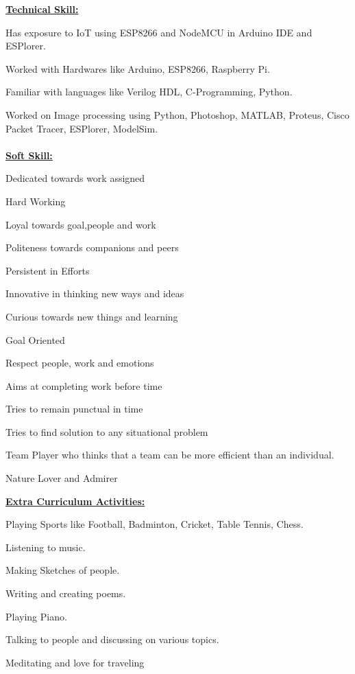 \documentclass[12pt]{report}
\begin{document}
{\vspace{205pt}
\textbf{\large{\underline{Technical Skill:}}}
\begin{itemize}
		\large{\item	Has exposure to IoT using ESP8266 and NodeMCU in Arduino IDE and ESPlorer. }
	\item Worked with Hardwares like Arduino, ESP8266, Raspberry Pi.
	\item Familiar with languages like Verilog HDL, C-Programming, Python.
	\item Worked on Image processing using Python, Photoshop, MATLAB, Proteus, Cisco Packet Tracer, ESPlorer, ModelSim. 
\end{itemize}

\paragraph{}\vspace{15pt}
\textbf{\large{\underline{Soft Skill:}}}
\begin{enumerate}
	\large{\item Dedicated towards work assigned}
	 \item Hard Working
	 \item Loyal towards goal,people and work
	 \item Politeness towards companions and peers \item Persistent in Efforts
	 \item Innovative in thinking new ways and ideas
	 \item Curious towards new things and learning
	 \item Goal Oriented
	 \item Respect people, work and emotions
	 \item Aims at completing work before time 
	 \item Tries to remain punctual in time 
	 \item Tries to find solution to any situational problem
	 \item Team Player who thinks that a team can be more efficient than an individual.
	 \item Nature Lover and Admirer
\end{enumerate}

\vspace{15pt}
\textbf{\large{\underline{Extra Curriculum Activities:}}}
\begin{itemize}
	\large{\item Playing Sports like Football, Badminton, Cricket, Table Tennis, Chess. }
	\item Listening to music. 
	\item Making Sketches of people.
	\item Writing and creating poems.
	\item Playing Piano.
	\item Talking to people and discussing on various topics.
	\item Meditating and love for traveling  
\end{itemize}

}
\end{document}
